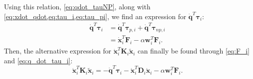 \documentclass[../main.tex]{subfiles}
\begin{document}
Using this relation, \eqref{eq:qdot_tauNP}, along with \cref{eq:xdot_qdot,eq:tau_i,eq:tau_pi}, we find an expression for $\dot{\bm{q}}^T\bm{\tau}_i$:
\begin{equation} \label{eq:q_dot_tau_i}
    \begin{aligned}
        \dot{\bm{q}}^T\bm{\tau}_{i} &= \dot{\bm{q}}^T\bm{\tau}_{p,i} + \dot{\bm{q}}^T\bm{\tau}_{np,i} \\
        & = \dot{\bm{x}}_{i}^T\bm{F}_{i}-\alpha\bm{w}_{i}^T\bm{F}_{i}.
    \end{aligned}
\end{equation}
Then, the alternative expression for $\dot{\bm{x}}_{i}^T\bm{K}_{i}\tilde{\bm{x}}_{i}$ can finally be found through \eqref{eq:F_i} and \eqref{eq:q_dot_tau_i}:
\begin{equation} \label{eq:xKx}
    \dot{\bm{x}}_{i}^T\bm{K}_{i}\tilde{\bm{x}}_{i}  = -\dot{\bm{q}}^T\bm{\tau}_{i} - \dot{\bm{x}}_{i}^T\bm{D}_{i}\dot{\bm{x}}_{i} - \alpha\bm{w}_{i}^T\bm{F}_{i}.
\end{equation}
\end{document}
